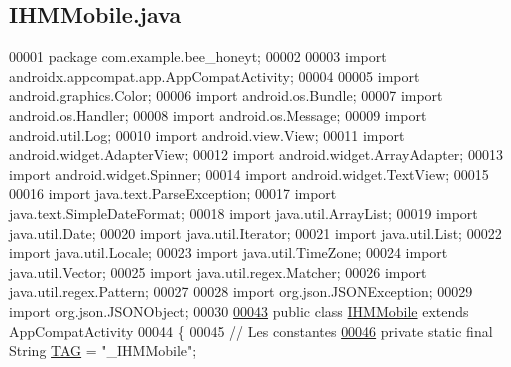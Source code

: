 \hypertarget{_i_h_m_mobile_8java_source}{}\subsection{I\+H\+M\+Mobile.\+java}
\label{_i_h_m_mobile_8java_source}

\begin{DoxyCode}
00001 \textcolor{keyword}{package }com.example.bee\_honeyt;
00002 
00003 \textcolor{keyword}{import} androidx.appcompat.app.AppCompatActivity;
00004 
00005 \textcolor{keyword}{import} android.graphics.Color;
00006 \textcolor{keyword}{import} android.os.Bundle;
00007 \textcolor{keyword}{import} android.os.Handler;
00008 \textcolor{keyword}{import} android.os.Message;
00009 \textcolor{keyword}{import} android.util.Log;
00010 \textcolor{keyword}{import} android.view.View;
00011 \textcolor{keyword}{import} android.widget.AdapterView;
00012 \textcolor{keyword}{import} android.widget.ArrayAdapter;
00013 \textcolor{keyword}{import} android.widget.Spinner;
00014 \textcolor{keyword}{import} android.widget.TextView;
00015 
00016 \textcolor{keyword}{import} java.text.ParseException;
00017 \textcolor{keyword}{import} java.text.SimpleDateFormat;
00018 \textcolor{keyword}{import} java.util.ArrayList;
00019 \textcolor{keyword}{import} java.util.Date;
00020 \textcolor{keyword}{import} java.util.Iterator;
00021 \textcolor{keyword}{import} java.util.List;
00022 \textcolor{keyword}{import} java.util.Locale;
00023 \textcolor{keyword}{import} java.util.TimeZone;
00024 \textcolor{keyword}{import} java.util.Vector;
00025 \textcolor{keyword}{import} java.util.regex.Matcher;
00026 \textcolor{keyword}{import} java.util.regex.Pattern;
00027 
00028 \textcolor{keyword}{import} org.json.JSONException;
00029 \textcolor{keyword}{import} org.json.JSONObject;
00030 
\hyperlink{classcom_1_1example_1_1bee__honeyt_1_1_i_h_m_mobile}{00043} \textcolor{keyword}{public} \textcolor{keyword}{class }\hyperlink{classcom_1_1example_1_1bee__honeyt_1_1_i_h_m_mobile}{IHMMobile} \textcolor{keyword}{extends} AppCompatActivity
00044 \{
00045     \textcolor{comment}{// Les constantes}
\hyperlink{classcom_1_1example_1_1bee__honeyt_1_1_i_h_m_mobile_a366987bf9bb2ed1010b2f967d4efa263}{00046}     \textcolor{keyword}{private} \textcolor{keyword}{static} \textcolor{keyword}{final} String \hyperlink{classcom_1_1example_1_1bee__honeyt_1_1_i_h_m_mobile_a366987bf9bb2ed1010b2f967d4efa263}{TAG} = \textcolor{stringliteral}{"\_IHMMobile"}; 

\end{DoxyCode}
